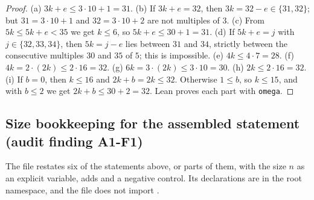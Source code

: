 \begin{proof}
(a) $3k+e\le3\cdot10+1=31$.
(b) If $3k+e=32$, then $3k=32-e\in\{31,32\}$; but $31=3\cdot10+1$ and $32=3\cdot10+2$ are not multiples of $3$.
(c) From $5k\le5k+e<35$ we get $k\le6$, so $5k+e\le30+1=31$.
(d) If $5k+e=j$ with $j\in\{32,33,34\}$, then $5k=j-e$ lies between $31$ and $34$, strictly between the consecutive
multiples $30$ and $35$ of $5$; this is impossible.
(e) $4k\le4\cdot7=28$.
(f) $4k=2\cdot(2k)\le2\cdot16=32$.
(g) $6k=3\cdot(2k)\le3\cdot10=30$.
(h) $2k\le2\cdot16=32$.
(i) If $b=0$, then $k\le16$ and $2k+b=2k\le32$. Otherwise $1\le b$, so $k\le15$, and with $b\le2$ we get
$2k+b\le30+2=32$.
Lean proves each part with \texttt{omega}.
\end{proof}

\subsection{Size bookkeeping for the assembled statement (audit finding A1-F1)}\label{sa:ssec:assembled}

The file  restates six of the statements above, or parts of them, with the size $n$ as an
explicit variable, adds  and a negative control. Its declarations are in the root namespace,
and the file does not import .


